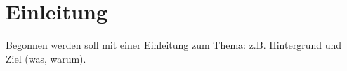 \chapter{Einleitung}

Begonnen werden soll mit einer Einleitung zum Thema: z.B. Hintergrund und Ziel (was, warum).
